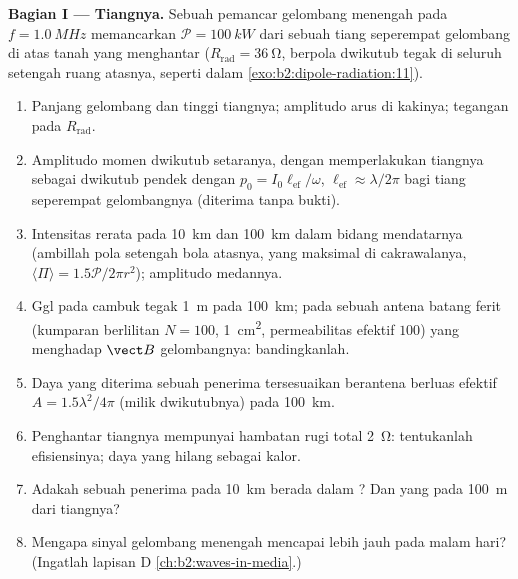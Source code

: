 \begin{problem}
\label{pb:b2:dipole-radiation:1}

\medskip
\noindent\textbf{Bagian I --- Tiangnya.}
Sebuah pemancar gelombang menengah pada $f = \qty{1.0}{MHz}$ memancarkan $\mathcal P = \qty{100}{kW}$
dari sebuah tiang seperempat gelombang di atas tanah yang menghantar ($R_{\text{rad}} = \qty{36}{\ohm}$,
berpola dwikutub tegak di seluruh setengah ruang atasnya, seperti dalam
\cref{exo:b2:dipole-radiation:11}).
\begin{enumerate}
  \item Panjang gelombang dan tinggi tiangnya; amplitudo arus di
        kakinya; tegangan pada $R_{\text{rad}}$.
  \item Amplitudo momen dwikutub setaranya, dengan memperlakukan tiangnya sebagai
        dwikutub pendek dengan $p_0 = I_0\ell_{\text{ef}}/\omega$, $\ell_{\text{ef}} \approx
        \lambda/2\pi$ bagi tiang seperempat gelombangnya (diterima tanpa bukti).
  \item Intensitas rerata pada \qty{10}{km} dan \qty{100}{km} dalam bidang
        mendatarnya (ambillah pola setengah bola atasnya, yang maksimal di
        cakrawalanya, $\langle\Pi\rangle = 1.5\mathcal P/2\pi r^2$); amplitudo medannya.
  \item Ggl pada cambuk tegak \qty{1}{m} pada \qty{100}{km}; pada sebuah antena
        batang ferit (kumparan berlilitan $N = 100$, \qty{1}{cm^2}, permeabilitas
        efektif $100$) yang menghadap $\vect B$ gelombangnya: bandingkanlah.
  \item Daya yang diterima sebuah penerima tersesuaikan berantena
        berluas efektif $A = 1.5\lambda^2/4\pi$ (milik dwikutubnya) pada \qty{100}{km}.
  \item Penghantar tiangnya mempunyai hambatan rugi total
        \qty{2}{\ohm}: tentukanlah efisiensinya; daya yang hilang sebagai kalor.
  \item Adakah sebuah penerima pada \qty{10}{km} berada dalam ? Dan yang pada
        \qty{100}{m} dari tiangnya?
  \item Mengapa sinyal gelombang menengah mencapai lebih jauh pada malam hari? (Ingatlah
        lapisan D \cref{ch:b2:waves-in-media}.)
\end{enumerate}


\end{problem}
